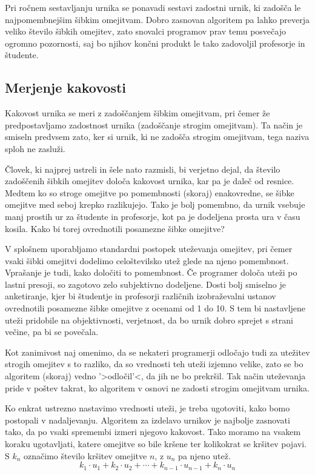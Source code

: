 \documentclass[a4paper, 10pt]{article}
\begin{document}
Pri ročnem sestavljanju urnika se ponavadi sestavi zadostni urnik, ki zadošča le
najpomembnejšim šibkim omejitvam. Dobro zasnovan algoritem pa lahko preverja veliko
število šibkih omejitev, zato snovalci programov prav temu posvečajo ogromno pozornosti,
saj bo njihov končni produkt le tako zadovoljil profesorje in študente.

\subsection{Merjenje kakovosti}

Kakovost urnika se meri z zadoščanjem šibkim omejitvam, pri čemer že predpostavljamo
zadostnost urnika (zadoščanje strogim omejitvam). Ta način je smiseln predvsem zato,
ker si urnik, ki ne zadošča strogim omejitvam, tega naziva sploh ne zasluži.

Človek, ki najprej ustreli in šele nato razmisli, bi verjetno dejal, da število
zadoščenih šibkih omejitev določa kakovost urnika, kar pa je daleč od resnice. Medtem
ko so stroge omejitve po pomembnosti (skoraj) enakovredne, se šibke omejitve med seboj
krepko razlikujejo. Tako je bolj pomembno, da urnik vsebuje manj prostih ur za
študente in profesorje, kot pa je dodeljena prosta ura v času kosila. Kako bi torej
ovrednotili posamezne šibke omejitve?

V splošnem uporabljamo standardni postopek uteževanja omejitev, pri čemer vsaki šibki
omejitvi dodelimo celoštevilsko utež glede na njeno pomembnost. Vprašanje je tudi, kako
določiti to pomembnost. Če programer določa uteži po lastni presoji, so zagotovo zelo
subjektivno dodeljene. Dosti bolj smiselno je anketiranje, kjer bi študentje in profesorji
različnih izobraževalni ustanov ovrednotili posamezne šibke omejitve z ocenami od 1 do 10.
S tem bi nastavljene uteži pridobile na objektivnosti, verjetnost, da bo urnik dobro
sprejet s strani večine, pa bi se povečala.

Kot zanimivost naj omenimo, da se nekateri programerji odločajo tudi za utežitev strogih
omejitev s to razliko, da so vrednosti teh uteži izjemno velike, zato se bo algoritem
(skoraj) vedno '>odločil'<, da jih ne bo prekršil. Tak način uteževanja pride v poštev
takrat, ko algoritem v osnovi ne zadosti strogim omejitvam urnika.

Ko enkrat ustrezno nastavimo vrednosti uteži, je treba ugotoviti, kako bomo postopali
v nadaljevanju. Algoritem za izdelavo urnikov je najbolje zasnovati tako, da po vsaki
spremembi izmeri njegovo kakovost. Tako moramo na vsakem koraku ugotavljati, katere
omejitve so bile kršene ter kolikokrat se kršitev pojavi. S $k_{n}$ označimo število
kršitev omejitve $n$, z $u_{n}$ pa njeno utež.
\[{k_{1}\cdot u_{1} + k_{2}\cdot u_{2} + \cdots + k_{n-1}\cdot u_{n-1} + k_{n} \cdot u_{n}}
\]
\end{document}
